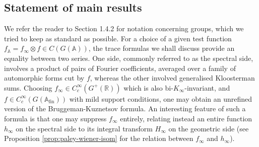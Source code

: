 \documentclass{article}
\numberwithin{equation}{section}
\begin{document}
\subsection{Statement of main results}
We refer the reader to Section 1.4.2 for notation concerning groups, which we tried to keep as standard as possible.
For a choice of a given test function $f_\mathbb{A}=f_\infty \otimes f\in C(G(\mathbb{A}))$,
the trace formulas we shall discuss provide an equality between two series. One side, commonly referred to as the spectral side, involves a product of pairs of Fourier coefficients, averaged over a family of automorphic forms cut by $f$, whereas the other involved generalised Kloosterman sums. Choosing $f_\infty \in C_c^\infty(G^+(\mathbb{R}))$ which is also bi-$K_\infty$-invariant, and $f\in C_c^\infty(G(\mathbb{A}_{\text{fin}}))$ with mild support conditions, one may obtain an unrefined version of the  Bruggeman-Kuznetsov formula. An interesting feature of such a formula is that one may suppress $f_\infty$ entirely, relating instead an entire function $h_\infty$ on the spectral side to its integral transform $H_\infty$ on the geometric side (see Proposition \ref{prop:paley-wiener-isom} for the relation between $f_\infty$ and $h_\infty$).
\end{document}
